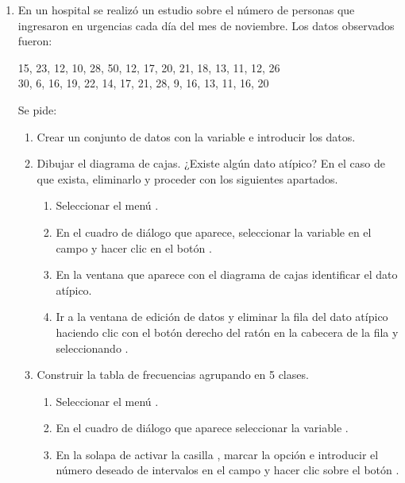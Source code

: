 \begin{enumerate}[leftmargin=*]
\item En un hospital se realizó un estudio sobre el número de personas que ingresaron en urgencias cada día del mes de
noviembre. Los datos observados fueron:
\begin{center}
15, 23, 12, 10, 28, 50, 12, 17, 20, 21, 18, 13, 11, 12, 26 \\
30, 6, 16, 19, 22, 14, 17, 21, 28, 9, 16, 13, 11, 16, 20
\end{center}
Se pide:

\begin{enumerate}
\item  Crear un conjunto de datos con la variable  e introducir los datos.

\item  Dibujar el diagrama de cajas. ¿Existe algún dato atípico? En el caso de que exista, eliminarlo y proceder con los
siguientes apartados.
\begin{indicacion}
\begin{enumerate}
\item Seleccionar el menú .
\item En el cuadro de diálogo que aparece, seleccionar la variable  en el campo  y
hacer clic en el botón .
\item En la ventana que aparece con el diagrama de cajas identificar el dato atípico.
\item Ir a la ventana de edición de datos y eliminar la fila del dato atípico haciendo clic con el botón derecho del
ratón en la cabecera de la fila y seleccionando . 
\end{enumerate}
\end{indicacion}

\item Construir la tabla de frecuencias agrupando en 5 clases.
\begin{indicacion}
\begin{enumerate}
\item Seleccionar el menú .
\item En el cuadro de diálogo que aparece seleccionar la variable .
\item En la solapa de  activar la casilla , marcar la opción  e introducir el número deseado de intervalos en el campo  y hacer clic sobre el botón
.
\end{enumerate}
\end{indicacion}


\end{enumerate}
\end{enumerate}

